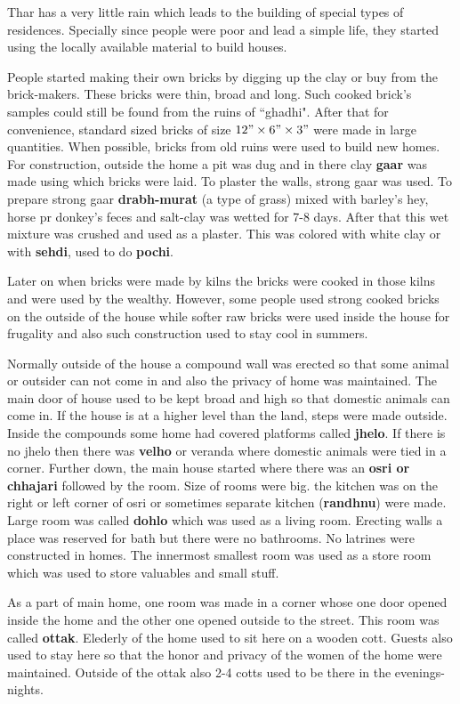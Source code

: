 Thar has a very little rain which leads to the building of special types of
residences. Specially since people were poor and lead a simple life, they
started using the locally available material to build houses.

People started making their own bricks by digging up the clay or buy from the
brick-makers. These bricks were thin, broad and long. Such cooked brick's
samples could still be found from the ruins of ``ghadhi". After that for
convenience, standard sized bricks of size $12" \times 6" \times 3"$ were made
in large quantities. When possible, bricks from old ruins were used to build new
homes. For construction, outside the home a pit was dug and in there clay
\textbf{gaar} was made using which bricks were laid. To plaster the walls,
strong gaar was used. To prepare strong gaar \textbf{drabh-murat} (a type of
grass) mixed with barley's hey, horse pr donkey's feces and salt-clay was wetted
for 7-8 days. After that this wet mixture was crushed and used as a plaster.
This was colored with white clay or with \textbf{sehdi}, used to do
\textbf{pochi}.

Later on when bricks were made by kilns the bricks were cooked in those kilns
and were used by the wealthy. However, some people used strong cooked bricks on
the outside of the house while softer raw bricks were used inside the house for
frugality and also such construction used to stay cool in summers.

Normally outside of the house a compound wall was erected so that some animal or
outsider can not come in and also the privacy of home was maintained. The main
door of house used to be kept broad and high so that domestic animals can come
in. If the house is at a higher level than the land, steps were made outside.
Inside the compounds some home had covered platforms called \textbf{jhelo}. If
there is no jhelo then there was \textbf{velho} or veranda where domestic
animals were tied in a corner. Further down, the main house started where there
was an \textbf{osri or chhajari} followed by the room. Size of rooms were big.
the kitchen was on the right or left corner of osri or sometimes separate
kitchen (\textbf{randhnu}) were made. Large room was called \textbf{dohlo} which
was used as a living room. Erecting walls a place was reserved for bath but
there were no bathrooms. No latrines were constructed in homes. The innermost
smallest room was used as a store room which was used to store valuables and
small stuff. 

As a part of main home, one room was made in a corner whose one door opened
inside the home and the other one opened outside to the street. This room was
called \textbf{ottak}. Elederly of the home used to sit here on a wooden cott.
Guests also used to stay here so that the honor and privacy of the women of the
home were maintained. Outside of the ottak also 2-4 cotts used to be there in
the evenings-nights.

